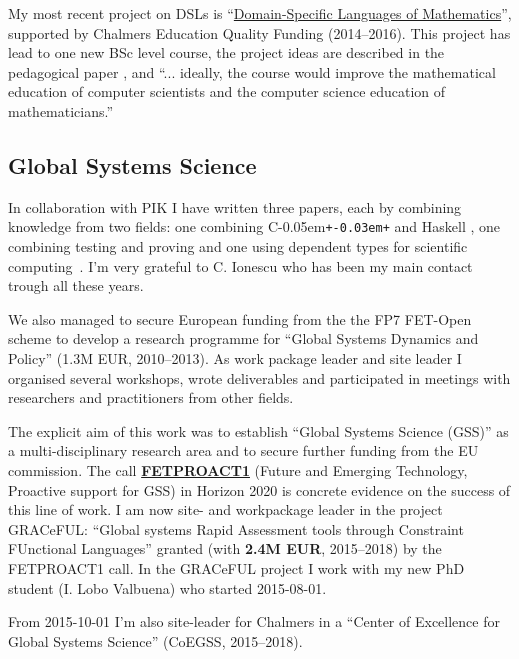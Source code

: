 \documentclass[11pt,twoside,twocolumn]{article}
\providecommand{\cpp}{C\kern-0.05em\texttt{+\kern-0.03em+}}
\providecommand{\Cpp}{\cpp}
\begin{document}
My most recent project on DSLs is
``\href{http://wiki.portal.chalmers.se/cse/pmwiki.php/FP/DSLsofMath}{Domain-Specific
  Languages of Mathematics}'', supported by Chalmers Education Quality
Funding (2014--2016).
%
This project has lead to one new BSc level course, the project ideas
are described in the pedagogical paper
\citep{TFPIE15_DSLsofMath_IonescuJansson},
%
and ``... ideally, the course would improve the mathematical education
of computer scientists and the computer science education of
mathematicians.''


\subsection{Global Systems Science}\label{sec:GSS}

In collaboration with PIK I have written three papers, each by
combining knowledge from two fields: one combining \Cpp{} and Haskell
\citep{LinckeJanssonetalDSLWC2009}, one combining testing and proving
\citep{ionescujansson:LIPIcs:2013:3899} and one using dependent types
for scientific computing~\citep{ionescujansson2013DTPinSciComp}.
%
I'm very grateful to C. Ionescu who has been my main contact trough
all these years.

We also managed to secure European funding from the the FP7 FET-Open
scheme to develop a research programme for ``Global Systems Dynamics
and Policy'' (1.3M EUR, 2010--2013).
%
As work package leader and site leader I organised several workshops,
wrote deliverables and participated in meetings with researchers and
practitioners from other fields.

The explicit aim of this work was to establish ``Global Systems
Science (GSS)'' as a multi-disciplinary research area and to secure further
funding from the EU commission.
%
The call
\textbf{\href{http://ec.europa.eu/research/participants/portal/desktop/en/opportunities/h2020/topics/2074-fetproact-1-2014.html}{FETPROACT1}}
(Future and Emerging Technology, Proactive support for GSS) in Horizon
2020 is concrete evidence on the success of this line of work.
%
I am now site- and workpackage leader in the project GRACeFUL:
``Global systems Rapid Assessment tools through Constraint FUnctional
Languages'' granted (with \textbf{2.4M EUR}, 2015--2018) by the
FETPROACT1 call.
%
In the GRACeFUL project I work with my new PhD student (I. Lobo
Valbuena) who started 2015-08-01.

From 2015-10-01 I'm also site-leader for Chalmers in a ``Center of
Excellence for Global Systems Science'' (CoEGSS, 2015--2018).
%
\end{document}
